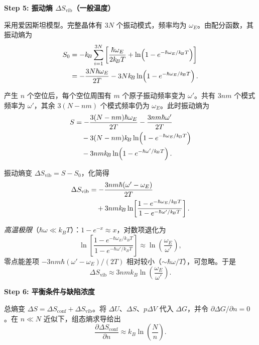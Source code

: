 \begin{derivationbox}[标准解题过程]
\textbf{Step 5: 振动熵 $\Delta S_{\mathrm{vib}}$（一般温度）}

采用爱因斯坦模型。完整晶体有 $3N$ 个振动模式，频率均为 $\omega_E$。由配分函数，其振动熵为
\begin{align}
S_0 &= -k_{\!B}\sum_{i=1}^{3N}\left[\frac{\hbar\omega_E}{2k_{\!B}T} + \ln\!\left(1-e^{-\hbar\omega_E/k_{\!B}T}\right)\right] \notag\\
&= -\frac{3N\hbar\omega_E}{2T} - 3Nk_{\!B}\ln\!\left(1-e^{-\hbar\omega_E/k_{\!B}T}\right).
\end{align}

产生 $n$ 个空位后，每个空位周围有 $m$ 个原子振动频率变为 $\omega'$。共有 $3nm$ 个模式频率为 $\omega'$，其余 $3(N-nm)$ 个模式频率仍为 $\omega_E$。此时振动熵为
\begin{align}
S &= -\frac{3(N-nm)\hbar\omega_E}{2T} - \frac{3nm\hbar\omega'}{2T} \notag\\
&\quad - 3(N-nm)k_{\!B}\ln\!\left(1-e^{-\hbar\omega_E/k_{\!B}T}\right) \notag\\
&\quad - 3nmk_{\!B}\ln\!\left(1-e^{-\hbar\omega'/k_{\!B}T}\right).
\end{align}

振动熵变 $\Delta S_{\mathrm{vib}} = S - S_0$，化简得
\begin{align}
\Delta S_{\mathrm{vib}} &= -\frac{3nm\hbar(\omega'-\omega_E)}{2T} \notag\\
&\quad + 3nmk_{\!B}\ln\!\left[\frac{1-e^{-\hbar\omega_E/k_{\!B}T}}{1-e^{-\hbar\omega'/k_{\!B}T}}\right].
\label{eq:schottky-vib-entropy-general}
\end{align}

\textit{高温极限}（$\hbar\omega\ll k_{\!B}T$）：$1-e^{-x}\approx x$，对数项退化为
\begin{equation}
\ln\!\left[\frac{1-e^{-\hbar\omega_E/k_{\!B}T}}{1-e^{-\hbar\omega'/k_{\!B}T}}\right]
\approx \ln\!\left(\frac{\omega_E}{\omega'}\right),
\end{equation}
零点能差项 $-3nm\hbar(\omega'-\omega_E)/(2T)$ 相对较小（$\sim\hbar\omega/T$），可忽略。于是
\begin{equation}
\Delta S_{\mathrm{vib}} \approx 3nmk_{\!B}\ln\!\left(\frac{\omega_E}{\omega'}\right).
\label{eq:schottky-vib-entropy-highT}
\end{equation}

\textbf{Step 6: 平衡条件与缺陷浓度}

总熵变 $\Delta S = \Delta S_{\mathrm{conf}} + \Delta S_{\mathrm{vib}}$。将 $\Delta U$、$\Delta S$、$p\Delta V$ 代入 $\Delta G$，并令 $\partial\Delta G/\partial n = 0$。在 $n\ll N$ 近似下，组态熵求导给出
\begin{equation}
\frac{\partial\Delta S_{\mathrm{conf}}}{\partial n}
\approx k_{\!B}\ln\!\left(\frac{N}{n}\right).
\end{equation}


\end{derivationbox}
